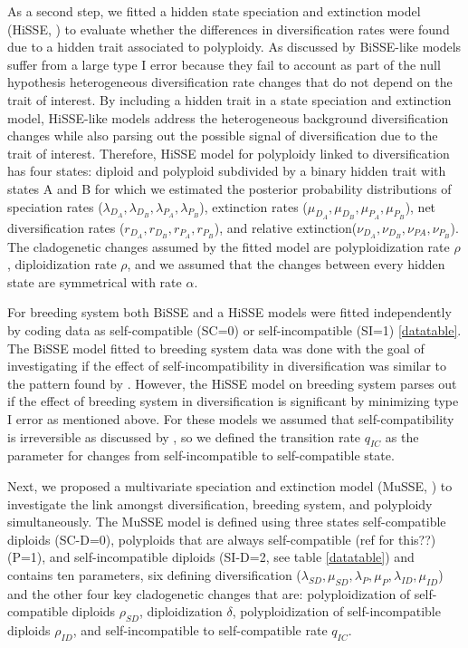 As a second step, we fitted a hidden state speciation and extinction model (HiSSE, \citet{beaulieu_2016}) to evaluate whether the differences in diversification rates were found due to a hidden trait associated to polyploidy. As discussed by \citet{beaulieu_2016} BiSSE-like models suffer from a large type I error because they fail to account as part of the null hypothesis heterogeneous diversification rate changes  that do not depend on the trait of interest. By including a hidden trait in a state speciation and extinction  model,  HiSSE-like models address the heterogeneous background diversification changes while also parsing out the possible signal of diversification due to the trait of interest. Therefore, HiSSE model for polyploidy linked to diversification has four states: diploid and polyploid subdivided by a binary hidden trait with states A and B for which we estimated the posterior probability distributions of speciation rates ($\lambda_{D_A},\lambda_{D_B}, \lambda_{P_A},\lambda_{P_B}$), extinction rates ($\mu_{D_A},\mu_{D_B}, \mu_{P_A},\mu_{P_B}$),  net diversification rates ($r_{D_A},r_{D_B},r_{P_A},r_{P_B}$), and relative extinction($\nu_{D_A},\nu_{D_B}, \nu_{PA},\nu_{P_B}$). The cladogenetic changes assumed by the fitted model are polyploidization rate $\rho$, diploidization rate $\rho$, and we assumed that the changes between every hidden state are symmetrical with rate $\alpha$. \newline

For breeding system both BiSSE and a HiSSE models were fitted independently by coding data as self-compatible (SC=0) or self-incompatible (SI=1) \ref{datatable}. The BiSSE model fitted to breeding system data was done with the goal of investigating if the effect of self-incompatibility in diversification was similar to the pattern found by  \citet{goldberg_2012}. However, the HiSSE model on breeding system parses out if the effect of breeding system in diversification is significant  by minimizing type I error as mentioned above. For these models we assumed that self-compatibility is irreversible as discussed by \citet{igic_2013}, so we defined the transition rate $q_{IC}$ as the parameter for changes from self-incompatible to self-compatible state.\newline

Next, we proposed a multivariate speciation and extinction model (MuSSE, \citet{fitzjohn_2012}) to investigate the link amongst diversification, breeding system, and polyploidy simultaneously. The MuSSE model is defined using three states self-compatible diploids (SC-D=0), polyploids that are always self-compatible (ref for this??) (P=1), and self-incompatible diploids (SI-D=2, see table \ref{datatable}) and contains ten parameters, six defining diversification ($\lambda_{SD}, \mu_{SD},\lambda_{P},\mu_{P}, \lambda_{ID},\mu_{ID}$) and the other four key cladogenetic changes that are: polyploidization of self-compatible diploids $\rho_{SD}$, diploidization $\delta$, polyploidization of self-incompatible diploids $\rho_{ID}$, and self-incompatible to self-compatible rate $q_{IC}$.\newline

